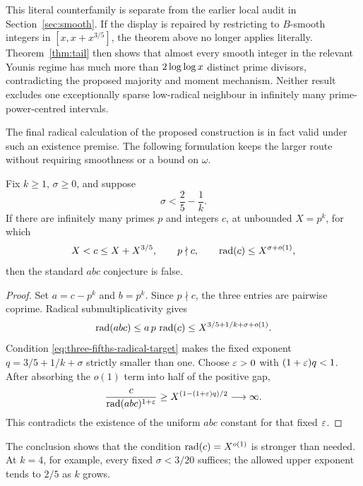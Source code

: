 This literal counterfamily is separate from the earlier local audit in
Section~\ref{sec:smooth}.  If the display is repaired by restricting to
$B$-smooth integers in $[x,x+x^{3/5}]$, the theorem above no longer applies
literally.  Theorem~\ref{thm:tail} then shows that almost every smooth
integer in the relevant Younis regime has much more than $2\log\log x$
distinct prime divisors, contradicting the proposed majority and moment
mechanism.  Neither result excludes one exceptionally sparse low-radical
neighbour in infinitely many prime-power-centred intervals.

The final radical calculation of the proposed construction is in fact valid
under such an existence premise.  The following formulation keeps the larger
route without requiring smoothness or a bound on $\omega$.

\begin{theorem}
\label{thm:three-fifths-radical-neighbour}
Fix $k\ge1$, $\sigma\ge0$, and suppose
\begin{equation}\label{eq:three-fifths-radical-target}
                       \sigma<\frac25-\frac1k.
\end{equation}
If there are infinitely many primes $p$ and integers $c$, at unbounded
$X=p^k$, for which
\begin{equation}\label{eq:three-fifths-neighbours}
 X<c\le X+X^{3/5},\qquad p\nmid c,\qquad
 \operatorname{rad}(c)\le X^{\sigma+o(1)},
\end{equation}
then the standard $abc$ conjecture is false.
\end{theorem}

\begin{proof}
Set $a=c-p^k$ and $b=p^k$.  Since $p\nmid c$, the three entries are
pairwise coprime.  Radical submultiplicativity gives
\[
 \operatorname{rad}(abc)\le a\,p\,\operatorname{rad}(c)
       \le X^{3/5+1/k+\sigma+o(1)}.
\]
Condition \eqref{eq:three-fifths-radical-target} makes the fixed exponent
$q=3/5+1/k+\sigma$ strictly smaller than one.  Choose $\varepsilon>0$ with
$(1+\varepsilon)q<1$.  After absorbing the $o(1)$ term into half of the positive
gap,
\[
 \frac{c}{\operatorname{rad}(abc)^{1+\varepsilon}}
       \ge X^{(1-(1+\varepsilon)q)/2}\longrightarrow\infty.
\]
This contradicts the existence of the uniform $abc$ constant for that
fixed $\varepsilon$.
\end{proof}

The conclusion shows that the condition $\operatorname{rad}(c)=X^{o(1)}$ is stronger than
needed.  At $k=4$, for example, every fixed $\sigma<3/20$ suffices; the
allowed upper exponent tends to $2/5$ as $k$ grows.

